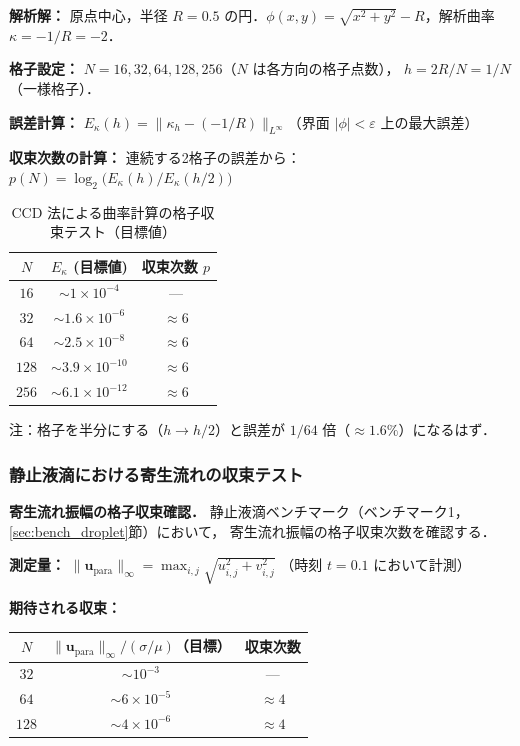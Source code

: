\begin{tcolorbox}[algbox, title={曲率 $\kappa$ の格子収束テスト手順}]
\textbf{解析解：} 原点中心，半径 $R=0.5$ の円．$\phi(x,y) = \sqrt{x^2+y^2} - R$，解析曲率 $\kappa = -1/R = -2$．

\textbf{格子設定：} $N = 16, 32, 64, 128, 256$（$N$ は各方向の格子点数），
$h = 2R/N = 1/N$（一様格子）．

\textbf{誤差計算：}
$E_\kappa(h) = \|\kappa_h - (-1/R)\|_{L^\infty}$（界面 $|\phi| < \varepsilon$ 上の最大誤差）

\textbf{収束次数の計算：} 連続する2格子の誤差から：
$p(N) = \log_2\!\bigl(E_\kappa(h)/E_\kappa(h/2)\bigr)$
\end{tcolorbox}

\begin{table}[htbp]
\centering
\caption{CCD 法による曲率計算の格子収束テスト（目標値）}
\label{tab:grid_conv}
\begin{tabular}{ccc}
\toprule
$N$ & $E_\kappa$ (目標値) & 収束次数 $p$ \\
\midrule
$16$  & $\sim 1 \times 10^{-4}$ & --- \\
$32$  & $\sim 1.6 \times 10^{-6}$ & $\approx 6$ \\
$64$  & $\sim 2.5 \times 10^{-8}$ & $\approx 6$ \\
$128$ & $\sim 3.9 \times 10^{-10}$ & $\approx 6$ \\
$256$ & $\sim 6.1 \times 10^{-12}$ & $\approx 6$ \\
\bottomrule
\end{tabular}

\medskip
注：格子を半分にする（$h \to h/2$）と誤差が $1/64$ 倍（$\approx 1.6\%$）になるはず．
\end{table}

\subsubsection{静止液滴における寄生流れの収束テスト}

\noindent\textbf{寄生流れ振幅の格子収束確認．}
静止液滴ベンチマーク（ベンチマーク1，\ref{sec:bench_droplet}節）において，
寄生流れ振幅の格子収束次数を確認する．

\textbf{測定量：} $\|\bm{u}_\text{para}\|_\infty = \max_{i,j}\sqrt{u_{i,j}^2 + v_{i,j}^2}$
（時刻 $t = 0.1$ において計測）

\textbf{期待される収束：}
\begin{center}
\begin{tabular}{ccc}
\hline
$N$ & $\|\bm{u}_\text{para}\|_\infty / (\sigma/\mu)$（目標） & 収束次数 \\
\hline
$32$ & $\sim 10^{-3}$ & --- \\
$64$ & $\sim 6 \times 10^{-5}$ & $\approx 4$ \\
$128$ & $\sim 4 \times 10^{-6}$ & $\approx 4$ \\
\hline
\end{tabular}
\end{center}

